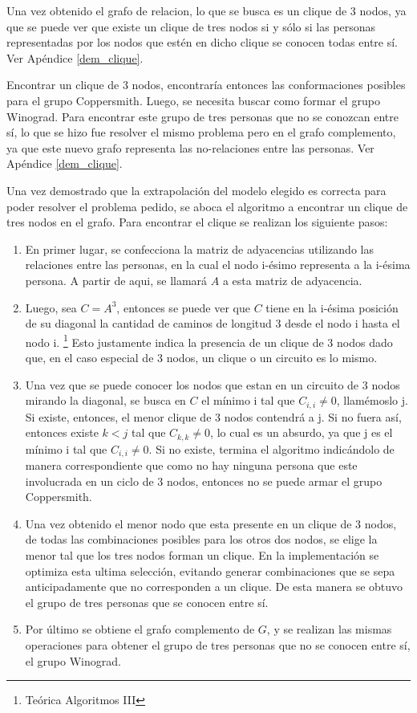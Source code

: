 \documentclass[a4paper, 12pt]{article}
\begin{document}
Una vez obtenido el grafo de relacion, lo que se busca es un clique de 3 nodos, ya que se puede ver que existe un clique de tres nodos si y s\'olo si las personas representadas por los nodos que est\'en en dicho clique se conocen todas entre s\'i. Ver Ap\'endice \ref{dem_clique}.


Encontrar un clique de 3 nodos, encontrar\'ia entonces las conformaciones posibles para el grupo Coppersmith. Luego, se necesita buscar como formar el grupo Winograd. Para encontrar este grupo de tres personas que no se conozcan entre s\'i, lo que se hizo fue resolver el mismo problema pero en el grafo complemento, ya que este nuevo grafo representa las no-relaciones entre las personas. Ver Ap\'endice \ref{dem_clique}.

Una vez demostrado que la extrapolaci\'on del modelo elegido es correcta para poder resolver el problema pedido, se aboca el algoritmo a encontrar un clique de tres nodos en el grafo.
Para encontrar el clique se realizan los siguiente pasos:

\begin{enumerate}
\item En primer lugar, se confecciona la matriz de adyacencias utilizando las relaciones entre las personas, en la cual el nodo i-\'esimo representa a la i-\'esima persona. A partir de aqui, se llamar\'a $A$ a esta matriz de adyacencia.
\item Luego, sea $C = A^3$, entonces se puede ver que $C$ tiene en la i-\'esima posici\'on de su diagonal la cantidad de caminos de longitud 3 desde el nodo i hasta el nodo i. \footnote{Te\'orica Algoritmos III} Esto justamente indica la presencia de un clique de 3 nodos dado que, en el caso especial de 3 nodos, un clique o un circuito es lo mismo.
\item Una vez que se puede conocer los nodos que estan en un circuito de 3 nodos mirando la diagonal, se busca en $C$ el m\'inimo i tal que $C_{i,i} \neq 0$, llam\'emoslo j. Si existe, entonces, el menor clique de 3 nodos contendr\'a a j. Si no fuera as\'i, entonces existe $k < j$ tal que $C_{k,k} \neq 0$, lo cual es un absurdo, ya que j es el m\'inimo i tal que $C_{i,i} \neq 0$. Si no existe, termina el algoritmo indic\'andolo de manera correspondiente que como no hay ninguna persona que este involucrada en un ciclo de 3 nodos, entonces no se puede armar el grupo Coppersmith.
\item Una vez obtenido el menor nodo que esta presente en un clique de 3 nodos, de todas las combinaciones posibles para los otros dos nodos, se elige la menor tal que los tres nodos forman un clique. En la implementaci\'on se optimiza esta ultima selecci\'on, evitando generar combinaciones que se sepa anticipadamente que no corresponden a un clique. De esta manera se obtuvo el grupo de tres personas que se conocen entre s\'i.
\item Por \'ultimo se obtiene el grafo complemento de $G$, y se realizan las mismas operaciones para obtener el grupo de tres personas que no se conocen entre s\'i, el grupo Winograd.
\end{enumerate}
\end{document}
